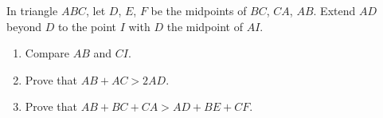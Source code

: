 In triangle \(ABC\), let \(D\), \(E\), \(F\) be the midpoints of \(BC\), \(CA\), \(AB\). Extend \(AD\) beyond \(D\) to the point \(I\) with \(D\) the midpoint of \(AI\).
\begin{enumerate}
\item[(a)] Compare \(AB\) and \(CI\).
\item[(b)] Prove that \(AB+AC>2AD\).
\item[(c)] Prove that \(AB+BC+CA>AD+BE+CF\).
\end{enumerate}
